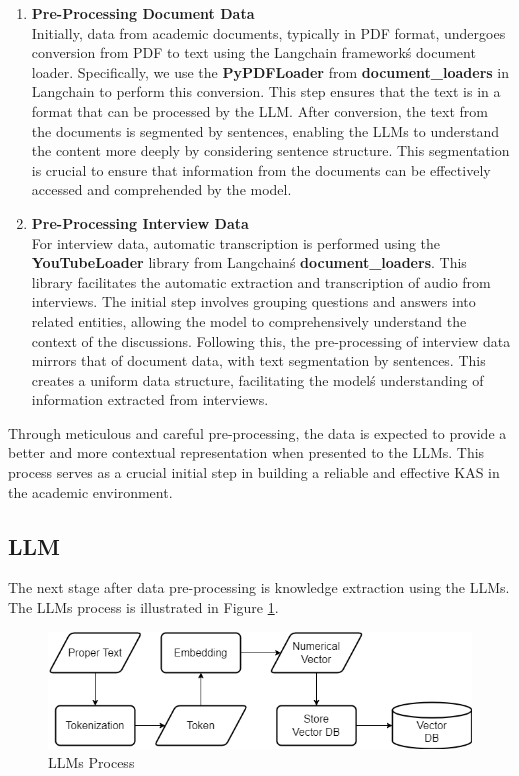 \documentclass[runningheads]{llncs}
\begin{document}
\begin{enumerate}
    \item \textbf{Pre-Processing Document Data} \\
    Initially, data from academic documents, typically in PDF format, undergoes conversion from PDF to text using the Langchain framework\'s document loader. Specifically, we use the \textbf{PyPDFLoader} from \textbf{document\_loaders} in Langchain to perform this conversion. This step ensures that the text is in a format that can be processed by the LLM. After conversion, the text from the documents is segmented by sentences, enabling the LLMs to understand the content more deeply by considering sentence structure. This segmentation is crucial to ensure that information from the documents can be effectively accessed and comprehended by the model.
    
    \item \textbf{Pre-Processing Interview Data} \\
    For interview data, automatic transcription is performed using the \textbf{YouTubeLoader} library from Langchain\'s  \textbf{document\_loaders}. This library facilitates the automatic extraction and transcription of audio from interviews. The initial step involves grouping questions and answers into related entities, allowing the model to comprehensively understand the context of the discussions. Following this, the pre-processing of interview data mirrors that of document data, with text segmentation by sentences. This creates a uniform data structure, facilitating the model\'s understanding of information extracted from interviews.
\end{enumerate}

Through meticulous and careful pre-processing, the data is expected to provide a better and more contextual representation when presented to the LLMs. This process serves as a crucial initial step in building a reliable and effective KAS in the academic environment.

\subsection{LLM}
The next stage after data pre-processing is knowledge extraction using the LLMs. The LLMs process is illustrated in Figure \ref{fig:llm}.

\begin{figure}[htbp]
    \centerline{\includegraphics[scale=0.4]{eng-llm.png}}
    \caption{LLMs Process}
    \label{fig:llm}
\end{figure}
\end{document}
